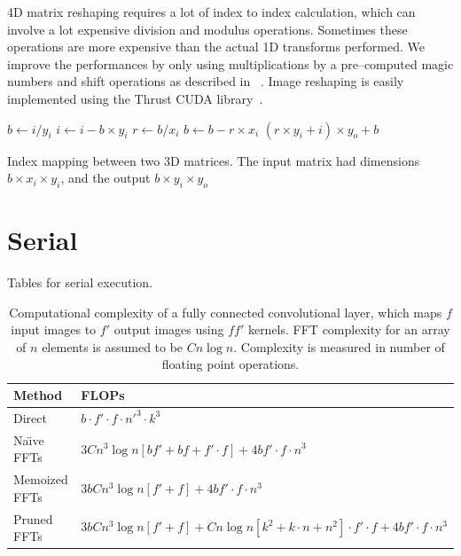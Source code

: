 \documentclass[conference]{IEEEtran}
\begin{document}
4D matrix reshaping requires a lot of index to index calculation,
which can involve a lot expensive division and modulus operations.
Sometimes these operations are more expensive than the actual 1D
transforms performed.  We improve the performances by only using
multiplications by a pre--computed magic numbers and shift operations
as described in ~\cite{warren2013hacker}.  Image reshaping is easily
implemented using the Thrust CUDA library~\cite{bell2011thrust}.


\begin{algorithm}
  {\small
  \begin{codebox}
    \li $b \gets i / y_i$
    \li $i \gets i - b \times y_i$
    \li $r \gets b / x_i$
    \li $b \gets b - r \times x_i$
    \li \Return $(r \times y_i + i) \times y_o + b$
  \end{codebox}
  }

  \caption{Index mapping between two 3D matrices.  The input matrix
  had dimensions $b \times x_i \times y_i$, and the output $b \times
  y_i \times y_o$} \label{alg:index_map}
\end{algorithm}


\section{Serial}

Tables for serial execution.

\begin{table}
  \centering
  \begin{tabular}{ll}
    \hline
    Method    &FLOPs
    \\ \hline
    Direct & $b \cdot f' \cdot f \cdot n'^3 \cdot k^3$
    \\
    Na\"{\i}ve FFTs & $3Cn^3 \log n[bf'+bf+f' \cdot f] + 4bf' \cdot f \cdot n^3$
    \\
    Memoized FFTs & $3bCn^3 \log n[f'+f] + 4bf' \cdot f \cdot n^3$
    \\
    Pruned FFTs & $3bCn^3 \log n[f'+f] + C n\log n[k^2 + k \cdot n + n^2] \cdot f' \cdot f + 4bf' \cdot f \cdot n^3$
    \\ \hline
  \end{tabular}
  \caption{Computational complexity of a fully connected convolutional
    layer, which maps $f$ input images to $f'$ output images using
    $ff'$ kernels. FFT complexity for an array of $n$ elements is
    assumed to be $Cn\log n$.  Complexity is measured in number of
    floating point operations.}
  \label{table:conv_complexity}
\end{table}
\end{document}
